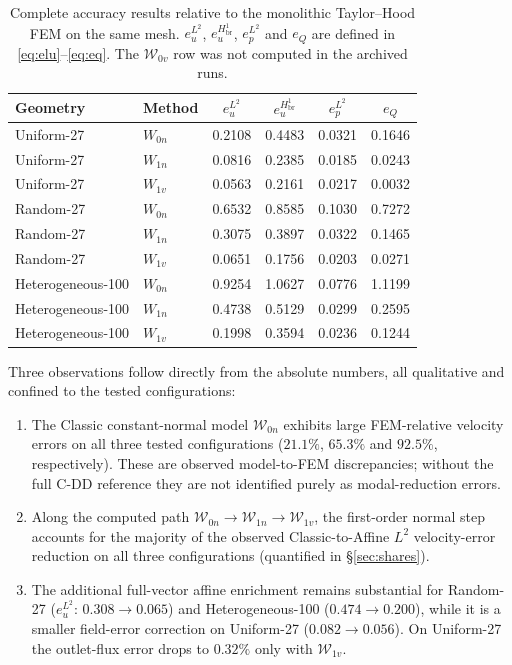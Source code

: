 \documentclass[11pt,a4paper]{article}
\newcommand{\Wspace}{\mathcal{W}}
\begin{document}
\begin{table}[t]
  \centering
  \small
  \caption{Complete accuracy results relative to the monolithic
    Taylor--Hood FEM on the same mesh.  $e_u^{L^2}$,
    $e_u^{H^1_{\mathrm{br}}}$, $e_p^{L^2}$ and $e_Q$ are defined in
    \eqref{eq:elu}--\eqref{eq:eq}.  The $\Wspace_{0v}$ row was not
    computed in the archived runs.}
  \label{tab:master}
  \begin{tabular}{llcccc}
    \toprule
    Geometry & Method & $e_u^{L^2}$ & $e_u^{H^1_{\mathrm{br}}}$ &
    $e_p^{L^2}$ & $e_Q$ \\
    \midrule
    Uniform-27 & $W_{0n}$ & 0.2108 & 0.4483 & 0.0321 & 0.1646 \\
    Uniform-27 & $W_{1n}$ & 0.0816 & 0.2385 & 0.0185 & 0.0243 \\
    Uniform-27 & $W_{1v}$ & 0.0563 & 0.2161 & 0.0217 & 0.0032 \\
    \addlinespace[2pt]
    Random-27 & $W_{0n}$ & 0.6532 & 0.8585 & 0.1030 & 0.7272 \\
    Random-27 & $W_{1n}$ & 0.3075 & 0.3897 & 0.0322 & 0.1465 \\
    Random-27 & $W_{1v}$ & 0.0651 & 0.1756 & 0.0203 & 0.0271 \\
    \addlinespace[2pt]
    Heterogeneous-100 & $W_{0n}$ & 0.9254 & 1.0627 & 0.0776 & 1.1199 \\
    Heterogeneous-100 & $W_{1n}$ & 0.4738 & 0.5129 & 0.0299 & 0.2595 \\
    Heterogeneous-100 & $W_{1v}$ & 0.1998 & 0.3594 & 0.0236 & 0.1244 \\
    \bottomrule
  \end{tabular}
\end{table}

Three observations follow directly from the absolute numbers, all
qualitative and confined to the tested configurations:

\begin{enumerate}[label=\textbf{(C\arabic*)}.,leftmargin=*,nosep]
\item The Classic constant-normal model $\Wspace_{0n}$ exhibits large
  FEM-relative velocity errors on all three tested configurations
  ($21.1\%$, $65.3\%$ and $92.5\%$, respectively).  These are observed
  model-to-FEM discrepancies; without the full C-DD reference they are
  not identified purely as modal-reduction errors.
\item Along the computed path $\Wspace_{0n}\to\Wspace_{1n}\to
  \Wspace_{1v}$, the first-order normal step accounts for the majority
  of the observed Classic-to-Affine $L^2$ velocity-error reduction on
  all three configurations (quantified in \S\ref{sec:shares}).
\item The additional full-vector affine enrichment remains substantial
  for Random-27 ($e_u^{L^2}$: $0.308\to0.065$) and Heterogeneous-100
  ($0.474\to0.200$), while it is a smaller field-error correction on
  Uniform-27 ($0.082\to0.056$).  On Uniform-27 the outlet-flux error
  drops to $0.32\%$ only with $\Wspace_{1v}$.
\end{enumerate}
\end{document}
